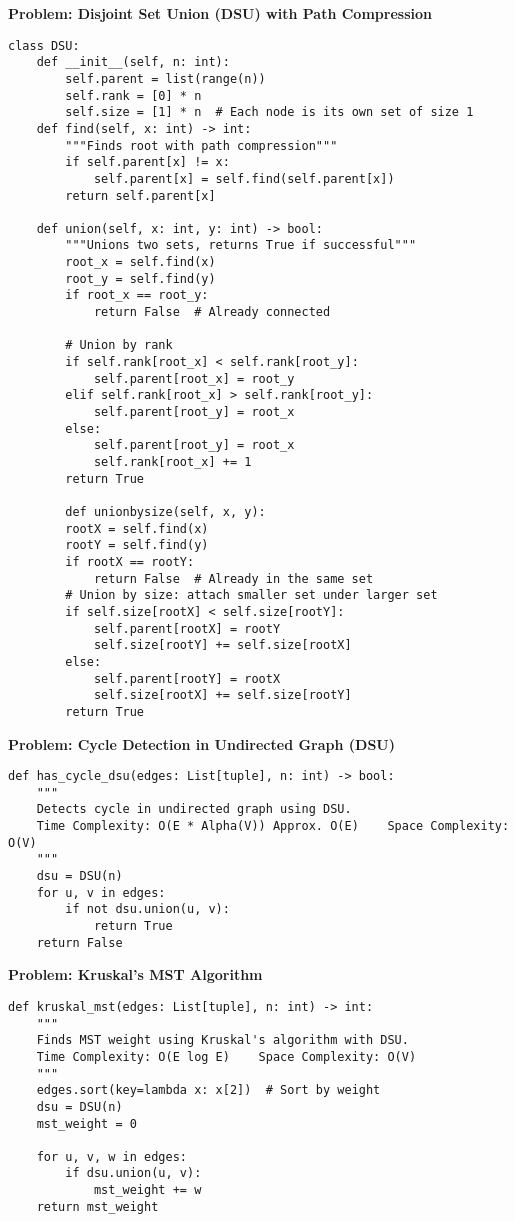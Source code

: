 \noindent\textbf{Problem: Disjoint Set Union (DSU) with Path Compression}
\begin{verbatim}
class DSU:
    def __init__(self, n: int):
        self.parent = list(range(n))
        self.rank = [0] * n
        self.size = [1] * n  # Each node is its own set of size 1
    def find(self, x: int) -> int:
        """Finds root with path compression"""
        if self.parent[x] != x:
            self.parent[x] = self.find(self.parent[x])
        return self.parent[x]
    
    def union(self, x: int, y: int) -> bool:
        """Unions two sets, returns True if successful"""
        root_x = self.find(x)
        root_y = self.find(y)
        if root_x == root_y:
            return False  # Already connected
            
        # Union by rank
        if self.rank[root_x] < self.rank[root_y]:
            self.parent[root_x] = root_y
        elif self.rank[root_x] > self.rank[root_y]:
            self.parent[root_y] = root_x
        else:
            self.parent[root_y] = root_x
            self.rank[root_x] += 1
        return True
        
        def unionbysize(self, x, y):
        rootX = self.find(x)
        rootY = self.find(y)
        if rootX == rootY:
            return False  # Already in the same set
        # Union by size: attach smaller set under larger set
        if self.size[rootX] < self.size[rootY]:
            self.parent[rootX] = rootY
            self.size[rootY] += self.size[rootX]
        else:
            self.parent[rootY] = rootX
            self.size[rootX] += self.size[rootY]
        return True
\end{verbatim}

\noindent\textbf{Problem: Cycle Detection in Undirected Graph (DSU)}
\begin{verbatim}
def has_cycle_dsu(edges: List[tuple], n: int) -> bool:
    """
    Detects cycle in undirected graph using DSU.
    Time Complexity: O(E * Alpha(V)) Approx. O(E)    Space Complexity: O(V)
    """
    dsu = DSU(n)
    for u, v in edges:
        if not dsu.union(u, v):
            return True
    return False
\end{verbatim}

\noindent\textbf{Problem: Kruskal's MST Algorithm}
\begin{verbatim}
def kruskal_mst(edges: List[tuple], n: int) -> int:
    """
    Finds MST weight using Kruskal's algorithm with DSU.
    Time Complexity: O(E log E)    Space Complexity: O(V)
    """
    edges.sort(key=lambda x: x[2])  # Sort by weight
    dsu = DSU(n)
    mst_weight = 0
    
    for u, v, w in edges:
        if dsu.union(u, v):
            mst_weight += w
    return mst_weight
\end{verbatim}

